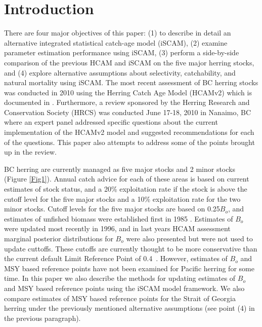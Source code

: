 

\section{Introduction}
	
There are four major objectives of this paper: (1) to describe in detail an alternative integrated statistical catch-age model (iSCAM), (2) examine parameter estimation performance using iSCAM, (3) perform a side-by-side comparison of the previous HCAM and iSCAM on the five major herring stocks, and (4) explore alternative assumptions about selectivity, catchability, and natural mortality using iSCAM.  The most recent assessment of BC herring stocks was conducted in 2010 using the Herring Catch Age Model (HCAMv2) which is documented in \cite{Clear2010}.  Furthermore, a review sponsored by the Herring Research and Conservation Society (HRCS) was conducted June 17-18, 2010 in Nanaimo, BC where an expert panel addressed specific questions about the current implementation of the HCAMv2 model and suggested recommendations for each of the questions.  This paper also attempts to address some of the points brought up in the review.

BC herring are currently managed as five major stocks and 2 minor stocks (Figure \ref{Fig1}).  Annual catch advice for each of these areas is based on current estimates of stock status, and a 20\% exploitation rate if the stock is above the cutoff level for the five major stocks and a 10\% exploitation rate for the two minor stocks.  Cutoff levels for the five major stocks are based on 0.25$B_o$, and estimates of unfished biomass were established first in 1985 \citep{haist1986stock}.  Estimates of $B_o$ were updated most recently in 1996, and in last years HCAM assessment marginal posterior distributions for $B_o$ were also presented but were not used to update cuttoffs.  These cutoffs are currently thought to be more conservative 	than the current default Limit Reference Point of 0.4\bmsy\ \citep{dfo2006}. However, estimates of $B_o$ and MSY based reference points have not been examined for Pacific herring for some time.  In this paper we also describe the methods for updating estimates of $B_o$ and MSY based reference points using the iSCAM model framework.  We also compare estimates of MSY based reference points for the Strait of Georgia herring under the previously mentioned alternative assumptions (see point (4) in the previous paragraph).

